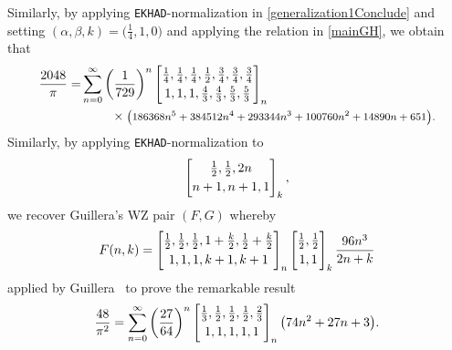 \documentclass[12pt]{article}
\begin{document}
 Similarly, by 
 applying {\tt EKHAD}-normalization in \eqref{generalization1Conclude}
 and setting 
 $(\alpha, \beta, k) = \big( \frac{1}{4}, 1, 0 \big)$ 
 and applying the relation in 
 \eqref{mainGH}, 
 we obtain that 
\begin{align*}
 \frac{2048}{\pi }
 = & \sum_{n = 
 0}^{\infty} 
 \left( \frac{1}{729} \right)^{n} 
 \left[ \begin{matrix} 
 \frac{1}{4}, \frac{1}{4}, \frac{1}{4}, \frac{1}{2}, \frac{3}{4}, \frac{3}{4}, \frac{3}{4} 
 \vspace{1mm} \\ 
 1, 1, 1, \frac{4}{3}, \frac{4}{3}, \frac{5}{3}, \frac{5}{3} 
 \end{matrix} \right]_{n} \\ 
 & \ \ \ \ \ \ \ \times \text{\footnotesize{$ \big( 186368 n^5+384512 n^4+293344 n^3+100760 n^2+14890 n+651 \big).$}} 
\end{align*}
 Similarly, by applying 
 {\tt EKHAD}-normalization to 
\begin{equation}\label{EKHADfor2764}
 \left[ \begin{matrix} 
 \frac{1}{2}, \frac{1}{2}, 2 n \vspace{1mm} \\ 
 n+1, n+1, 1 
 \end{matrix} \right]_{k}, 
\end{equation}
 we recover Guillera's WZ pair $(F, G)$ whereby 
 $$ F(n, k) = \left[ \begin{matrix} 
 \frac{1}{2}, \frac{1}{2}, \frac{1}{2}, 1 + \frac{k}{2}, \frac{1}{2} + \frac{k}{2} \vspace{1mm} \\ 
 1, 1, 1, k+1, k+1 
 \end{matrix} \right]_{n} 
 \left[ \begin{matrix} 
 \frac{1}{2}, \frac{1}2{} \vspace{1mm} \\ 
 1, 1 
 \end{matrix} \right]_{k} \frac{96 n^3}{2n+k} $$ 
 applied by Guillera~\cite{Guillera2011} to prove the remarkable result 
\begin{equation*}
 \frac{48}{\pi^2} 
 = \sum_{n = 
 0}^{\infty} 
 \left( \frac{27}{64} \right)^{n} 
 \left[ \begin{matrix} 
 \frac{1}{3}, \frac{1}{2}, \frac{1}{2}, \frac{1}{2}, \frac{2}{3} \vspace{1mm} \\ 
 1, 1, 1, 1, 1 \end{matrix} \right]_{n} 
 \big( 74 n^2 + 27 n + 3 \big). 
\end{equation*}
\end{document}
